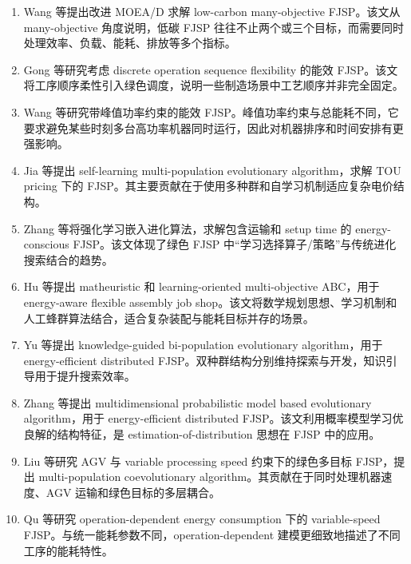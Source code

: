 \documentclass[UTF8,a4paper,11pt]{ctexart}
\begin{document}
\begin{enumerate}[label=\textbf{G\arabic*.},leftmargin=3em]
\item Wang 等提出改进 MOEA/D 求解 low-carbon many-objective FJSP\cite{Wang2024MOEAD}。该文从 many-objective 角度说明，低碳 FJSP 往往不止两个或三个目标，而需要同时处理效率、负载、能耗、排放等多个指标。

\item Gong 等研究考虑 discrete operation sequence flexibility 的能效 FJSP\cite{Gong2024SequenceFlex}。该文将工序顺序柔性引入绿色调度，说明一些制造场景中工艺顺序并非完全固定。

\item Wang 等研究带峰值功率约束的能效 FJSP\cite{Wang2024PeakPower}。峰值功率约束与总能耗不同，它要求避免某些时刻多台高功率机器同时运行，因此对机器排序和时间安排有更强影响。

\item Jia 等提出 self-learning multi-population evolutionary algorithm，求解 TOU pricing 下的 FJSP\cite{Jia2024TOU}。其主要贡献在于使用多种群和自学习机制适应复杂电价结构。

\item Zhang 等将强化学习嵌入进化算法，求解包含运输和 setup time 的 energy-conscious FJSP\cite{Zhang2024EATA}。该文体现了绿色 FJSP 中“学习选择算子/策略”与传统进化搜索结合的趋势。

\item Hu 等提出 matheuristic 和 learning-oriented multi-objective ABC，用于 energy-aware flexible assembly job shop\cite{Hu2024ABC}。该文将数学规划思想、学习机制和人工蜂群算法结合，适合复杂装配与能耗目标并存的场景。

\item Yu 等提出 knowledge-guided bi-population evolutionary algorithm，用于 energy-efficient distributed FJSP\cite{Yu2024BiPop}。双种群结构分别维持探索与开发，知识引导用于提升搜索效率。

\item Zhang 等提出 multidimensional probabilistic model based evolutionary algorithm，用于 energy-efficient distributed FJSP\cite{Zhang2024ProbModel}。该文利用概率模型学习优良解的结构特征，是 estimation-of-distribution 思想在 FJSP 中的应用。

\item Liu 等研究 AGV 与 variable processing speed 约束下的绿色多目标 FJSP，提出 multi-population coevolutionary algorithm\cite{Liu2024AGVSpeed}。其贡献在于同时处理机器速度、AGV 运输和绿色目标的多层耦合。

\item Qu 等研究 operation-dependent energy consumption 下的 variable-speed FJSP\cite{Qu2024OperationEnergy}。与统一能耗参数不同，operation-dependent 建模更细致地描述了不同工序的能耗特性。


\end{enumerate}
\end{document}
